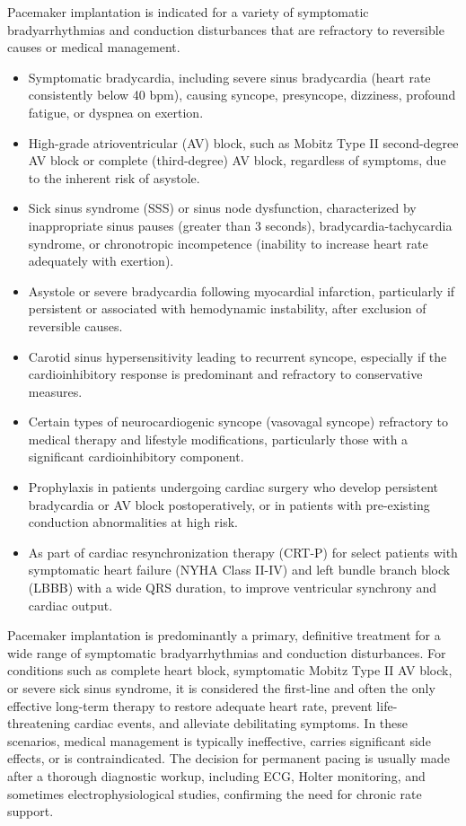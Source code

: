 Pacemaker implantation is indicated for a variety of symptomatic bradyarrhythmias and conduction disturbances that are refractory to reversible causes or medical management.

\begin{itemize}
  \item Symptomatic bradycardia, including severe sinus bradycardia (heart rate consistently below 40 bpm), causing syncope, presyncope, dizziness, profound fatigue, or dyspnea on exertion.
  \item High-grade atrioventricular (AV) block, such as Mobitz Type II second-degree AV block or complete (third-degree) AV block, regardless of symptoms, due to the inherent risk of asystole.
  \item Sick sinus syndrome (SSS) or sinus node dysfunction, characterized by inappropriate sinus pauses (greater than 3 seconds), bradycardia-tachycardia syndrome, or chronotropic incompetence (inability to increase heart rate adequately with exertion).
  \item Asystole or severe bradycardia following myocardial infarction, particularly if persistent or associated with hemodynamic instability, after exclusion of reversible causes.
  \item Carotid sinus hypersensitivity leading to recurrent syncope, especially if the cardioinhibitory response is predominant and refractory to conservative measures.
  \item Certain types of neurocardiogenic syncope (vasovagal syncope) refractory to medical therapy and lifestyle modifications, particularly those with a significant cardioinhibitory component.
  \item Prophylaxis in patients undergoing cardiac surgery who develop persistent bradycardia or AV block postoperatively, or in patients with pre-existing conduction abnormalities at high risk.
  \item As part of cardiac resynchronization therapy (CRT-P) for select patients with symptomatic heart failure (NYHA Class II-IV) and left bundle branch block (LBBB) with a wide QRS duration, to improve ventricular synchrony and cardiac output.
\end{itemize}

Pacemaker implantation is predominantly a primary, definitive treatment for a wide range of symptomatic bradyarrhythmias and conduction disturbances. For conditions such as complete heart block, symptomatic Mobitz Type II AV block, or severe sick sinus syndrome, it is considered the first-line and often the only effective long-term therapy to restore adequate heart rate, prevent life-threatening cardiac events, and alleviate debilitating symptoms. In these scenarios, medical management is typically ineffective, carries significant side effects, or is contraindicated. The decision for permanent pacing is usually made after a thorough diagnostic workup, including ECG, Holter monitoring, and sometimes electrophysiological studies, confirming the need for chronic rate support.

